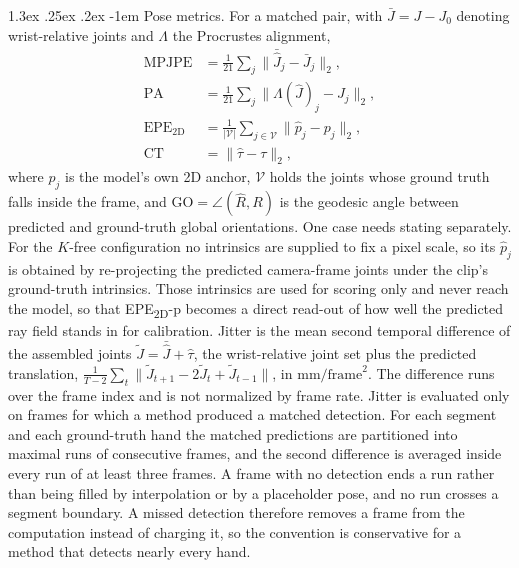 \documentclass[10pt,twocolumn,letterpaper]{article}
\makeatletter
\renewcommand\paragraph{\@startsection{paragraph}{4}{\z@}%
  {1.3ex \@plus .25ex \@minus .2ex}%
  {-1em}%
  {\normalfont\normalsize\bfseries}}
\makeatother
\begin{document}
\paragraph{Pose metrics.} For a matched pair, with $\bar J=J-J_{0}$ denoting wrist-relative joints and $\Lambda$ the Procrustes alignment,
\begin{align}
\mathrm{MPJPE}&=\tfrac{1}{21}\textstyle\sum_j \lVert \bar{\hat J}_j-\bar J_j\rVert_2,\\
\mathrm{PA}&=\tfrac{1}{21}\textstyle\sum_j \lVert \Lambda(\hat J)_j-J_j\rVert_2,\\
\mathrm{EPE_{2D}}&=\tfrac{1}{|\mathcal{V}|}\textstyle\sum_{j\in\mathcal{V}} \lVert \hat p_j-p_j\rVert_2,\\
\mathrm{CT}&=\lVert \hat\tau-\tau\rVert_2,
\end{align}
where $\hat p_j$ is the model's own 2D anchor, $\mathcal{V}$ holds the joints whose ground truth falls inside the frame, and $\mathrm{GO}=\angle(\hat R,R)$ is the geodesic angle between predicted and ground-truth global orientations. One case needs stating separately. For the $K$-free configuration no intrinsics are supplied to fix a pixel scale, so its $\hat p_j$ is obtained by re-projecting the predicted camera-frame joints under the clip's ground-truth intrinsics. Those intrinsics are used for scoring only and never reach the model, so that EPE\textsubscript{2D}-p becomes a direct read-out of how well the predicted ray field stands in for calibration. Jitter is the mean second temporal difference of the assembled joints $\tilde J=\bar{\hat J}+\hat\tau$, the wrist-relative joint set plus the predicted translation, $\tfrac{1}{T-2}\sum_t\lVert \tilde J_{t+1}-2\tilde J_{t}+\tilde J_{t-1}\rVert$, in $\mathrm{mm}/\mathrm{frame}^2$. The difference runs over the frame index and is not normalized by frame rate. Jitter is evaluated only on frames for which a method produced a matched detection. For each segment and each ground-truth hand the matched predictions are partitioned into maximal runs of consecutive frames, and the second difference is averaged inside every run of at least three frames. A frame with no detection ends a run rather than being filled by interpolation or by a placeholder pose, and no run crosses a segment boundary. A missed detection therefore removes a frame from the computation instead of charging it, so the convention is conservative for a method that detects nearly every hand.
\end{document}
